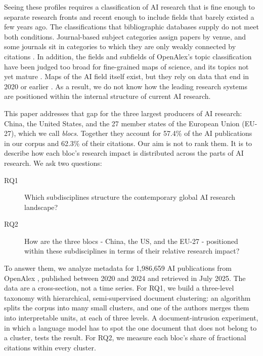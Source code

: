 \documentclass[10pt,twocolumn,a4paper]{article}
\begin{document}
	Seeing these profiles requires a classification of AI research that is fine enough to separate research fronts and recent enough to include fields that barely existed a few years ago. The classifications that bibliographic databases supply do not meet both conditions. Journal-based subject categories assign papers by venue, and some journals sit in categories to which they are only weakly connected by citations \parencite{wang2016large}. In addition, the fields and subfields of OpenAlex's topic classification have been judged too broad for fine-grained maps of science, and its topics not yet mature \parencite{haunschild2024use}. Maps of the AI field itself exist, but they rely on data that end in 2020 or earlier \parencite{righi2020ai,gargiulo2022cartography}. As a result, we do not know how the leading research systems are positioned within the internal structure of current AI research.
	
	This paper addresses that gap for the three largest producers of AI research: China, the United States, and the 27 member states of the European Union (EU-27), which we call \textit{blocs}. Together they account for 57.4\% of the AI publications in our corpus and 62.3\% of their citations. Our aim is not to rank them. It is to describe how each bloc's research impact is distributed across the parts of AI research. We ask two questions:
	
	\begin{description}
		\item[RQ1] Which subdisciplines structure the contemporary global AI research landscape?
		\item[RQ2] How are the three blocs - China, the US, and the EU-27 - positioned within these subdisciplines in terms of their relative research impact?
	\end{description}
	
	To answer them, we analyze metadata for 1,986,659 AI publications from OpenAlex \parencite{openalex2023}, published between 2020 and 2024 and retrieved in July 2025. The data are a cross-section, not a time series. For RQ1, we build a three-level taxonomy with hierarchical, semi-supervised document clustering: an algorithm splits the corpus into many small clusters, and one of the authors merges them into interpretable units, at each of three levels. A document-intrusion experiment, in which a language model has to spot the one document that does not belong to a cluster, tests the result. For RQ2, we measure each bloc's share of fractional citations within every cluster.
	
\end{document}
